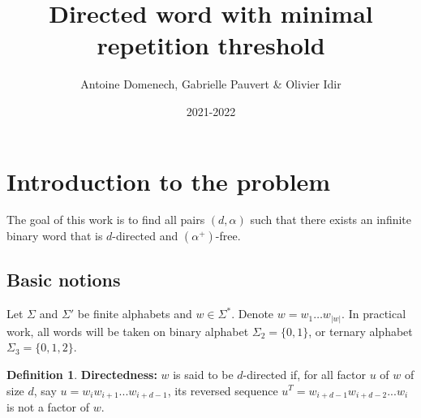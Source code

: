 \documentclass[a4paper]{article}
\title{Directed word with minimal repetition threshold}
\author{Antoine Domenech, Gabrielle Pauvert \& Olivier Idir}
\date{2021-2022}
\theoremstyle{definition}
\newtheorem{definition}{Definition}[section]
\begin{document}
\maketitle

\section{Introduction to the problem}

The goal of this work is to find all pairs $(d, \alpha)$ such that there exists an infinite binary word that is $d$-directed and $(\alpha^+)$-free.

\subsection{Basic notions}

Let $\Sigma$ and $\Sigma'$ be finite alphabets and $w \in \Sigma^*$. Denote $w = w_1 \dots w_{|w|}$. In practical work, all words will be taken on binary alphabet $\Sigma_2 = \{0,1\}$, or ternary alphabet $\Sigma_3 = \{0,1,2\}$.

\begin{definition}{\textbf{Directedness:}}
$w$ 
is said to be $d$-directed if, for all factor $u$ of $w$ of size $d$, say $u = w_iw_{i+1}...w_{i+d-1}$, its reversed sequence $u^T = w_{i+d-1}w_{i+d-2}...w_i$ is not a factor of $w$.
\end{definition}
\end{document}
